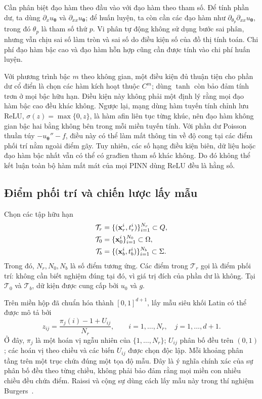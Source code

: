 Cần phân biệt đạo hàm theo đầu vào với đạo hàm theo tham số. Để tính
phần dư, ta dùng $\partial_xu_{\boldsymbol{\theta}}$ và
$\partial_{xx}u_{\boldsymbol{\theta}}$; để huấn luyện, ta còn cần các
đạo hàm như $\partial_{\theta_p}\partial_{xx}u_{\boldsymbol{\theta}}$,
trong đó $\theta_p$ là tham số thứ $p$. Vi phân tự động không sử dụng
bước sai phân, nhưng vẫn chịu sai số làm tròn và sai số do điều kiện
số của đồ thị tính toán. Chi phí đạo hàm bậc cao và đạo hàm hỗn hợp
cũng cần được tính vào chi phí huấn luyện.

Với phương trình bậc $m$ theo không gian, một điều kiện đủ thuận tiện
cho phần dư cổ điển là chọn các hàm kích hoạt thuộc $C^m$; dùng
$\tanh$ còn bảo đảm tính trơn ở mọi bậc hữu hạn. Điều kiện này không
phải một định lý rằng mọi đạo hàm bậc cao đều khác không. Ngược lại,
mạng dùng hàm tuyến tính chỉnh lưu ReLU, $\sigma(z)=\max\{0,z\}$, là hàm afin liên tục từng
khúc, nên đạo hàm không gian bậc hai bằng không bên trong mỗi miền
tuyến tính. Với phần dư Poisson thuần túy $-u_{\boldsymbol{\theta}}''-f$,
điều này có thể làm mất thông tin về độ cong tại các điểm phối trí nằm
ngoài điểm gãy. Tuy nhiên, các số hạng điều kiện biên, dữ liệu hoặc
đạo hàm bậc nhất vẫn có thể có građien tham số khác không. Do đó không
thể kết luận toàn bộ hàm mất mát của mọi PINN dùng ReLU đều là hằng số.

\subsection{Điểm phối trí và chiến lược lấy mẫu}

Chọn các tập hữu hạn
\begin{align}
 \mathcal{T}_r&=\{(\mathbf{x}_r^i,t_r^i)\}_{i=1}^{N_r}\subset Q,\notag\\
 \mathcal{T}_0&=\{\mathbf{x}_0^i\}_{i=1}^{N_0}\subset\Omega,\notag\\
 \mathcal{T}_b&=\{(\mathbf{x}_b^i,t_b^i)\}_{i=1}^{N_b}\subset\Sigma.
 \label{p4:eq:sets}
\end{align}
Trong đó, $N_r,N_0,N_b$ là số điểm tương ứng. Các điểm trong
$\mathcal{T}_r$ gọi là điểm phối trí: không cần biết nghiệm đúng tại
đó, vì giá trị đích của phần dư là không. Tại $\mathcal{T}_0$ và
$\mathcal{T}_b$, dữ kiện được cung cấp bởi $u_0$ và $g$.

Trên miền hộp đã chuẩn hóa thành $[0,1]^{d+1}$, lấy mẫu siêu khối Latin
có thể được mô tả bởi
\begin{equation}
 z_{ij}=\frac{\pi_j(i)-1+U_{ij}}{N_r},
 \qquad i=1,\ldots,N_r,\quad j=1,\ldots,d+1.
 \label{p4:eq:lhs}
\end{equation}
Ở đây, $\pi_j$ là một hoán vị ngẫu nhiên của $\{1,\ldots,N_r\}$;
$U_{ij}$ phân bố đều trên $(0,1)$; các hoán vị theo chiều và các biến
$U_{ij}$ được chọn độc lập. Mỗi khoảng phân tầng trên một trục chứa
đúng một tọa độ mẫu. Đây là ý nghĩa chính xác của sự phân bố đều theo
từng chiều, không phải bảo đảm rằng mọi miền con nhiều chiều đều chứa
điểm. Raissi và cộng sự dùng cách lấy mẫu này trong thí nghiệm
Burgers~\cite{raissi2017a}.

